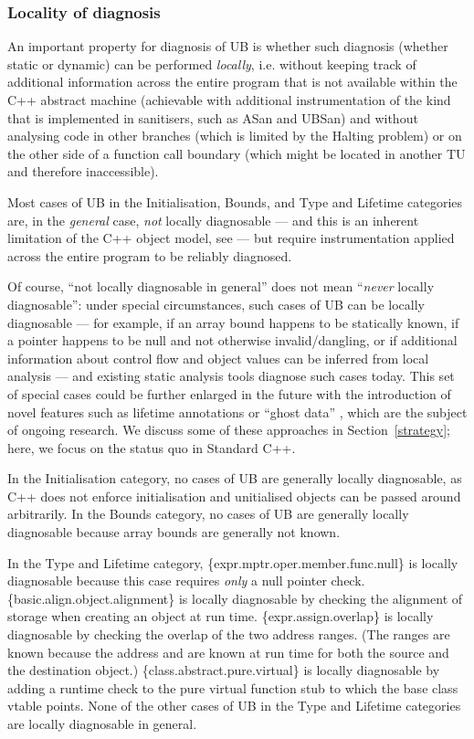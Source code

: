\subsubsection{Locality of diagnosis}
\label{locally}

An important property for diagnosis of UB is whether such diagnosis (whether static or dynamic) can be performed \emph{locally}, i.e. without keeping track of additional information across the entire program that is not available within the C++ abstract machine (achievable with additional instrumentation of the kind that is implemented in sanitisers, such as ASan and UBSan) and without analysing code in other branches (which is limited by the Halting problem) or on the other side of a function call boundary (which might be located in another TU and therefore inaccessible).

Most cases of UB in the Initialisation, Bounds, and Type and Lifetime categories are, in the \emph{general} case, \emph{not} locally diagnosable --- and this is an inherent limitation of the C++ object model, see \cite{Baxter2024} --- but require instrumentation applied across the entire program to be reliably diagnosed.

Of course, ``not locally diagnosable in general'' does not mean ``\emph{never} locally diagnosable'': under special circumstances, such cases of UB can be locally diagnosable --- for example, if an array bound happens to be statically known, if a pointer happens to be null and not otherwise invalid/dangling, or if additional information about control flow and object values can be inferred from local analysis --- and existing static analysis tools diagnose such cases today. This set of special cases could be further enlarged in the future with the introduction of novel features such as lifetime annotations \cite{P2771R1} or ``ghost data'' \cite{Lippincott2025}, which are the subject of ongoing research. We discuss some of these approaches in Section~\ref{strategy}; here, we focus on the status quo in  Standard C++.

In the Initialisation category, no cases of UB are generally locally diagnosable, as C++ does not enforce initialisation and unitialised objects can be passed around arbitrarily. In the Bounds category, no cases of UB are generally locally diagnosable because array bounds are generally not known.

In the Type and Lifetime category, 
\{expr.mptr.oper.member.func.null\} is locally diagnosable because this case requires \emph{only} a null pointer check.
\{basic.align.object.alignment\} is locally diagnosable by checking the alignment of storage when creating an object at run time.
\{expr.assign.overlap\} is locally diagnosable by checking the overlap of the two address ranges. (The ranges are known because the address and  are known at run time for both the source and the destination object.) \{class.abstract.pure.virtual\} is locally diagnosable by adding a runtime check to  the pure virtual function stub to which the base class vtable points. None of the other cases of UB in the Type and Lifetime categories are locally diagnosable in general.

